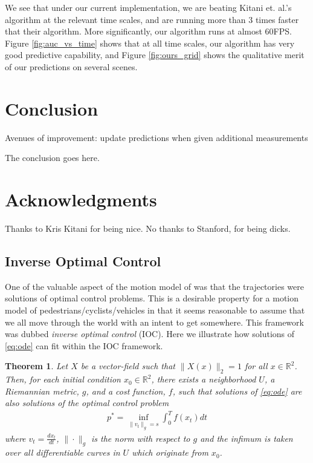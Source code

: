 \documentclass[conference]{IEEEtran}
\newtheorem{thm}{Theorem}
\begin{document}
We see that under our current implementation, we are beating Kitani et. al.'s algorithm at the relevant time scales, and are running more than 3 times faster that their algorithm. More significantly, our algorithm runs at almost 60FPS. Figure \ref{fig:auc_vs_time} shows that at all time scales, our algorithm has very good predictive capability, and Figure \ref{fig:ours_grid} shows the qualitative merit of our predictions on several scenes.





\section{Conclusion} 
\label{sec:conclusion}

Avenues of improvement:
update predictions when given additional measurements

The conclusion goes here.

\section*{Acknowledgments}
Thanks to Kris Kitani for being nice.  No thanks to Stanford, for being dicks.

\appendix
\subsection{Inverse Optimal Control} \label{app:ioc}
One of the valuable aspect of the motion model of \cite{Kitani2012} was that the trajectories were solutions of optimal control problems.
This is a desirable property for a motion model of pedestrians/cyclists/vehicles in that it seems reasonable to assume that we all move through the world with an intent to get somewhere.
This framework was dubbed \emph{inverse optimal control} (IOC).
Here we illustrate how solutions of \eqref{eq:ode} can fit within the IOC framework.

\begin{thm}
	Let $X$ be a vector-field such that $\| X(x) \|_2 = 1$ for all $x \in \mathbb{R}^2$.
Then, for each initial condition $x_0 \in \mathbb{R}^2$, there exists a neighborhood $U$, a Riemannian metric, $g$, and a cost function, $f$, 
such that solutions of \eqref{eq:ode} are also solutions of the optimal control problem
\begin{align}
	p^* = \inf_{ \| v_t \|_g = s } \int_0^T f( x_t) dt \label{eq:IOC}
\end{align}
where $v_t = \frac{d x_t}{dt}$, $\| \cdot \|_g$ is the norm with respect to $g$ and the infimum is taken over all differentiable curves in $U$ which originate from $x_0$.
\end{thm}
\end{document}
